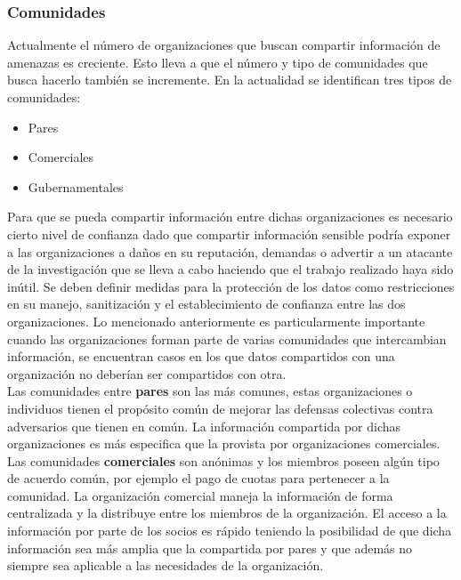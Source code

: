 \subsubsection{Comunidades}
Actualmente el número de organizaciones que buscan compartir información de
amenazas es creciente. Esto lleva a que el número y tipo de comunidades que busca
hacerlo también se incremente. En la actualidad se identifican tres tipos de comunidades:
\begin{itemize}
  \item Pares
  \item Comerciales
  \item Gubernamentales
\end{itemize}

Para que se pueda compartir información entre dichas organizaciones es necesario
cierto nivel de confianza dado que compartir información sensible podría exponer 
a las organizaciones a daños en su reputación, demandas o advertir a un 
atacante de la investigación que se lleva a cabo haciendo que el trabajo 
realizado haya sido inútil. Se deben definir medidas para la protección de los 
datos como restricciones en su manejo, sanitización y el establecimiento de 
confianza entre las dos organizaciones. Lo mencionado anteriormente es 
particularmente importante cuando las organizaciones forman parte de varias 
comunidades que intercambian información, se encuentran casos en los que datos 
compartidos con una organización no deberían ser compartidos con otra.\\

Las comunidades entre \textbf{pares} son las más comunes, estas organizaciones o 
individuos tienen el propósito común de mejorar las defensas colectivas contra 
adversarios que tienen en común. La información compartida por dichas 
organizaciones es más especifica que la provista por organizaciones comerciales.\\

Las comunidades \textbf{comerciales} son anónimas y los miembros poseen algún tipo de 
acuerdo común, por ejemplo el pago de cuotas para pertenecer a la comunidad. 
La organización comercial maneja la información de forma centralizada y la 
distribuye entre los miembros de la organización. El acceso a la información por 
parte de los socios es rápido teniendo la posibilidad de que dicha información 
sea más amplia que la compartida por pares y que además no siempre sea aplicable a las 
necesidades de la organización.\\

